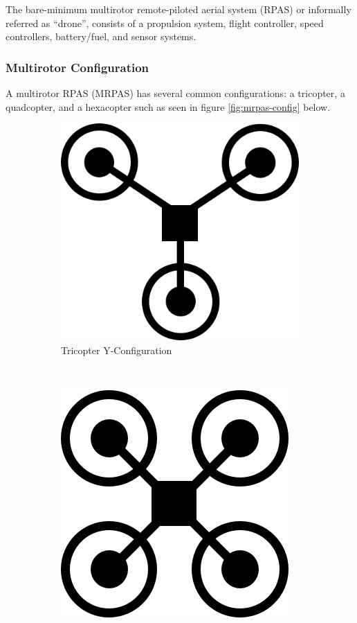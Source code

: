 The bare-minimum multirotor remote-piloted aerial system (RPAS) or informally referred as ``drone'', consists of a propulsion system, flight controller, speed controllers, battery/fuel, and sensor systems.

\subsubsection{Multirotor Configuration}

A multirotor RPAS (MRPAS) has several common configurations: a tricopter, a quadcopter, and a hexacopter such as seen in figure \ref{fig:mrpas-config} below.

\begin{figure}[H]\label{fig:mrpas-configs}
    \centering
    \begin{subfigure}[b]{0.3\textwidth}
        \centering
        \includegraphics[scale=0.4]{img/drone_yconfig}
        \caption{Tricopter Y-Configuration}
        \label{fig:tricopter-y}
    \end{subfigure}
    ~
    \begin{subfigure}[b]{0.3\textwidth}
        \centering
        \includegraphics[scale=0.4]{img/drone_xconfig}

\end{subfigure}
\end{figure}
